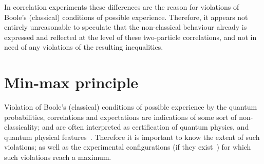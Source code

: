 \documentclass[%
  twocolumn,
 showpacs,
 showkeys,
 preprintnumbers,
 amsmath,amssymb,
 aps,
  pra,
  longbibliography,
 floatfix,
 ]{revtex4-1}
\begin{document}
In correlation experiments these differences are the reason for violations of Boole's
(classical) conditions of possible experience.
Therefore, it appears not entirely unreasonable to speculate that
the non-classical behaviour already is expressed and reflected at the level of these two-particle correlations,
and not in need of any violations of the resulting inequalities.


\section{Min-max principle}

Violation of  Boole's
(classical) conditions of possible experience
by the quantum probabilities, correlations  and expectations
are indications of some sort of non-classicality;
and are often interpreted as certification of
quantum physics, and quantum physical features~\cite{belrand2010,Um-2013}.
Therefore it is important to know the extent of such violations; as well as the experimental configurations
(if they exist~\cite{specker57})
for which such violations reach a maximum.
\end{document}
